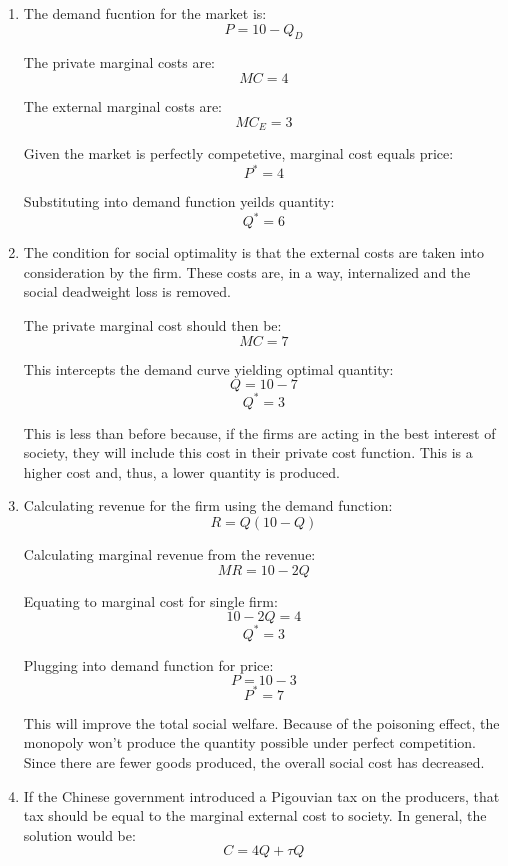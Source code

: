 \documentclass{article}
\begin{document}
\begin{enumerate}[1.]
    \item The demand fucntion for the market is:
        $$ P = 10 - Q_{D} $$

        The private marginal costs are:
        $$ MC = 4 $$

        The external marginal costs are:
        $$ MC_{E} = 3 $$

        Given the market is perfectly competetive, marginal cost equals price:
        $$ P^{*} = 4 $$

        Substituting into demand function yeilds quantity:
        $$ Q^{*} = 6 $$

    \item The condition for social optimality is that the external costs are
        taken into consideration by the firm. These costs are, in a way, 
        internalized and the social deadweight loss is removed. 
        
        \bigbreak

        The private marginal cost should then be:
        $$ MC = 7 $$

        This intercepts the demand curve yielding optimal quantity:
        $$ Q = 10 - 7 $$
        $$ Q^{*} = 3 $$

        This is less than before because, if the firms are acting in the best
        interest of society, they will include this cost in their private cost
        function. This is a higher cost and, thus, a lower quantity is produced.

    \item Calculating revenue for the firm using the demand function:
        $$ R = Q ( 10 - Q ) $$

        Calculating marginal revenue from the revenue:
        $$ MR = 10 - 2Q $$

        Equating to marginal cost for single firm:
        $$ 10 - 2 Q = 4 $$
        $$ Q^{*} = 3 $$

        Plugging into demand function for price:
        $$ P = 10 - 3 $$
        $$ P^{*} = 7 $$

        This will improve the total social welfare. Because of the poisoning
        effect, the monopoly won't produce the quantity possible under perfect
        competition. Since there are fewer goods produced, the overall social
        cost has decreased.

    \item If the Chinese government introduced a Pigouvian tax on the producers,
        that tax should be equal to the marginal external cost to society. In
        general, the solution would be:
        $$ C = 4Q + \tau Q $$


\end{enumerate}
\end{document}

